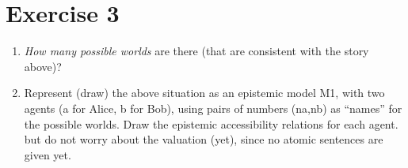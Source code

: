 \documentclass[leqno]{article}
\begin{document}
\section*{Exercise 3}

\begin{enumerate}

    \item \textit{How many possible worlds} are there (that are consistent with the story above)?\\
    \begin{center}
    \end{center}

    \item Represent (draw) the above situation as an epistemic model M1, with two agents (a for Alice, b for Bob),  using pairs of numbers (na,nb) as “names” for the possible worlds. Draw the epistemic accessibility  relations for each agent. but  do
    not worry about the valuation (yet), since no atomic sentences are given yet.\\


\end{enumerate}
\end{document}
